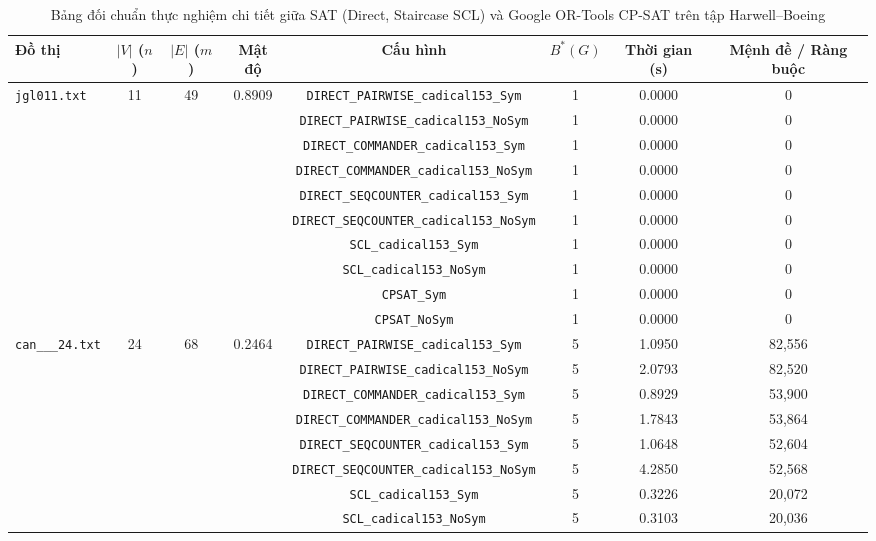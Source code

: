 \documentclass[a4paper,fleqn]{cas-sc}
\begin{document}
\clearpage
\begin{table}[pos=p]
\centering
\caption{Bảng đối chuẩn thực nghiệm chi tiết giữa SAT (Direct, Staircase SCL) và Google OR-Tools CP-SAT trên tập Harwell--Boeing}
\label{tab:benchmark_sat_cpsat}
\scriptsize
\renewcommand{\arraystretch}{0.84}
\begin{tabular}{lccccccc}
\toprule
\textbf{Đồ thị} & \textbf{$|V|$ ($n$)} & \textbf{$|E|$ ($m$)} & \textbf{Mật độ} & \textbf{Cấu hình} & \textbf{$B^*(G)$} & \textbf{Thời gian (s)} & \textbf{Mệnh đề / Ràng buộc} \\
\midrule
\texttt{jgl011.txt} & 11 & 49 & 0.8909 & \texttt{DIRECT\_PAIRWISE\_cadical153\_Sym} & 1 & 0.0000 & 0 \\
 & & & & \texttt{DIRECT\_PAIRWISE\_cadical153\_NoSym} & 1 & 0.0000 & 0 \\
 & & & & \texttt{DIRECT\_COMMANDER\_cadical153\_Sym} & 1 & 0.0000 & 0 \\
 & & & & \texttt{DIRECT\_COMMANDER\_cadical153\_NoSym} & 1 & 0.0000 & 0 \\
 & & & & \texttt{DIRECT\_SEQCOUNTER\_cadical153\_Sym} & 1 & 0.0000 & 0 \\
 & & & & \texttt{DIRECT\_SEQCOUNTER\_cadical153\_NoSym} & 1 & 0.0000 & 0 \\
 & & & & \texttt{SCL\_cadical153\_Sym} & 1 & 0.0000 & 0 \\
 & & & & \texttt{SCL\_cadical153\_NoSym} & 1 & 0.0000 & 0 \\
 & & & & \texttt{CPSAT\_Sym} & 1 & 0.0000 & 0 \\
 & & & & \texttt{CPSAT\_NoSym} & 1 & 0.0000 & 0 \\
\midrule
\texttt{can\_\_\_24.txt} & 24 & 68 & 0.2464 & \texttt{DIRECT\_PAIRWISE\_cadical153\_Sym} & 5 & 1.0950 & 82,556 \\
 & & & & \texttt{DIRECT\_PAIRWISE\_cadical153\_NoSym} & 5 & 2.0793 & 82,520 \\
 & & & & \texttt{DIRECT\_COMMANDER\_cadical153\_Sym} & 5 & 0.8929 & 53,900 \\
 & & & & \texttt{DIRECT\_COMMANDER\_cadical153\_NoSym} & 5 & 1.7843 & 53,864 \\
 & & & & \texttt{DIRECT\_SEQCOUNTER\_cadical153\_Sym} & 5 & 1.0648 & 52,604 \\
 & & & & \texttt{DIRECT\_SEQCOUNTER\_cadical153\_NoSym} & 5 & 4.2850 & 52,568 \\
 & & & & \texttt{SCL\_cadical153\_Sym} & 5 & 0.3226 & 20,072 \\
 & & & & \texttt{SCL\_cadical153\_NoSym} & 5 & 0.3103 & 20,036 \\

\end{tabular}
\end{table}
\end{document}
